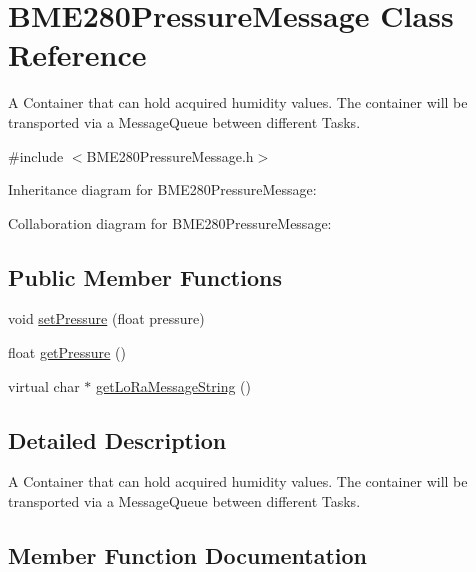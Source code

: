 \hypertarget{class_b_m_e280_pressure_message}{}\section{B\+M\+E280\+Pressure\+Message Class Reference}
\label{class_b_m_e280_pressure_message}


A Container that can hold acquired humidity values. The container will be transported via a Message\+Queue between different Tasks.  




{\ttfamily \#include $<$B\+M\+E280\+Pressure\+Message.\+h$>$}



Inheritance diagram for B\+M\+E280\+Pressure\+Message\+:


Collaboration diagram for B\+M\+E280\+Pressure\+Message\+:
\subsection*{Public Member Functions}
\begin{DoxyCompactItemize}
\item 
void \hyperlink{class_b_m_e280_pressure_message_a1417f6bde15cb37bc25cc0f2d078301e}{set\+Pressure} (float pressure)
\item 
float \hyperlink{class_b_m_e280_pressure_message_aab5f01061d929b7756fbaf6ac850b9c7}{get\+Pressure} ()
\item 
virtual char $\ast$ \hyperlink{class_b_m_e280_pressure_message_a39d1703529dbc2d06480a16f87616500}{get\+Lo\+Ra\+Message\+String} ()
\end{DoxyCompactItemize}


\subsection{Detailed Description}
A Container that can hold acquired humidity values. The container will be transported via a Message\+Queue between different Tasks. 

\subsection{Member Function Documentation}
\hypertarget{class_b_m_e280_pressure_message_a39d1703529dbc2d06480a16f87616500}{}
